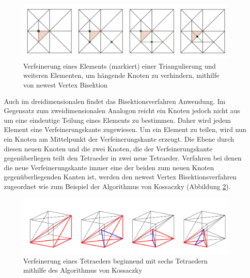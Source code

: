 \begin{figure}[!htbp]
	\begin{center}
		\includegraphics[width=16cm]{pics/bisec2.png}
	\end{center}
	\caption{\label{bisec}Verfeinerung eines Elements (markiert) einer Triangulierung und weiteren Elementen, um hängende Knoten zu verhindern, mithilfe von newest Vertex Bisektion}
\end{figure}

Auch im dreidimensionalen findet das Bisektionsverfahren Anwendung. Im Gegensatz zum zweidimensionalen Analogon reicht ein Knoten jedoch nicht aus um eine eindeutige Teilung eines Elements zu bestimmen. Daher wird jedem Element eine Verfeinerungskante zugewiesen. Um ein Element zu teilen, wird nun ein Knoten am Mittelpunkt der Verfeinerungskante erzeugt. Die Ebene durch diesen neuen Knoten und die zwei Knoten, die der Verfeinerungskante gegenüberliegen teilt den Tetraeder in zwei neue Tetraeder. Verfahren bei denen die neue Verfeinerungskante immer eine der beiden zum neuen Knoten gegenüberliegenden Kanten ist, werden den newest Vertex Bisektionsverfahren zugeordnet wie zum Beispiel der Algorithmus von Kossaczky (Abbildung \ref{kos}).

\begin{figure}[!htbp]
\begin{center}
	\includegraphics[width=16cm]{pics/bisec3.png}
\end{center}
\caption{\label{kos}Verfeinerung eines Tetraeders beginnend mit sechs Tetraedern mithilfe des Algorithmus von Kossaczky}
\end{figure}